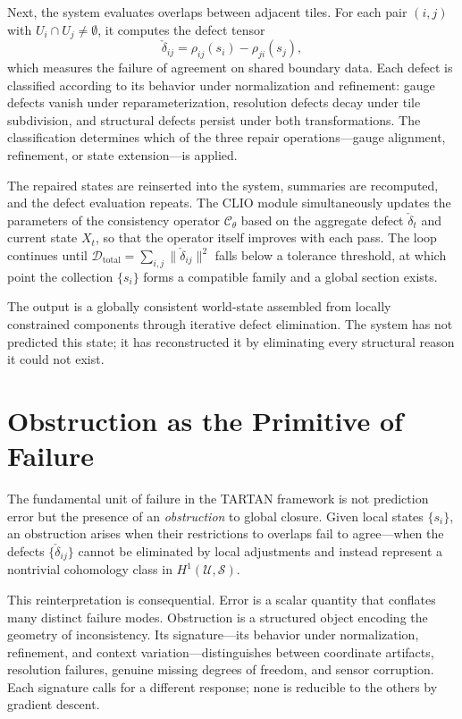 \documentclass[12pt, oneside]{article}
\begin{document}
Next, the system evaluates overlaps between adjacent tiles. For each pair $(i,j)$ with $U_i \cap U_j \neq \emptyset$, it computes the defect tensor
\[
\check{\delta}_{ij} = \rho_{ij}(s_i) - \rho_{ji}(s_j),
\]
which measures the failure of agreement on shared boundary data. Each defect is classified according to its behavior under normalization and refinement: gauge defects vanish under reparameterization, resolution defects decay under tile subdivision, and structural defects persist under both transformations. The classification determines which of the three repair operations---gauge alignment, refinement, or state extension---is applied.

The repaired states are reinserted into the system, summaries are recomputed, and the defect evaluation repeats. The CLIO module simultaneously updates the parameters of the consistency operator $\mathcal{C}_\theta$ based on the aggregate defect $\check{\delta}_t$ and current state $X_t$, so that the operator itself improves with each pass. The loop continues until $\mathcal{D}_{\text{total}} = \sum_{i,j} \|\check{\delta}_{ij}\|^2$ falls below a tolerance threshold, at which point the collection $\{s_i\}$ forms a compatible family and a global section exists.

The output is a globally consistent world-state assembled from locally constrained components through iterative defect elimination. The system has not predicted this state; it has reconstructed it by eliminating every structural reason it could not exist.

\section{Obstruction as the Primitive of Failure}

The fundamental unit of failure in the TARTAN framework is not prediction error but the presence of an \emph{obstruction} to global closure. Given local states $\{s_i\}$, an obstruction arises when their restrictions to overlaps fail to agree---when the defects $\{\check{\delta}_{ij}\}$ cannot be eliminated by local adjustments and instead represent a nontrivial cohomology class in $H^1(\mathcal{U}, \mathcal{S})$.

This reinterpretation is consequential. Error is a scalar quantity that conflates many distinct failure modes. Obstruction is a structured object encoding the geometry of inconsistency. Its signature---its behavior under normalization, refinement, and context variation---distinguishes between coordinate artifacts, resolution failures, genuine missing degrees of freedom, and sensor corruption. Each signature calls for a different response; none is reducible to the others by gradient descent.
\end{document}
